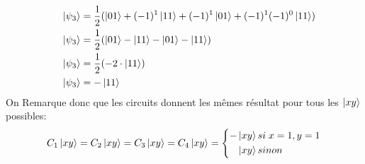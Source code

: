 \documentclass{article}
\begin{document}
\begin{align*}
&&      \ket{\psi_3} &= \frac{1}{2}(\ket{01} + (-1)^1\ket{11} + (-1)^1\ket{01} + (-1)^1(-1)^0\ket{11}) \\
&&      \ket{\psi_3} &= \frac{1}{2}(\ket{01} - \ket{11} - \ket{01} - \ket{11}) \\
&&      \ket{\psi_3} &= \frac{1}{2}(-2 \cdot \ket{11}) \\
&&      \ket{\psi_3} &= -\ket{11} \\
\end{align*}
On Remarque donc que les circuits donnent les mêmes résultat pour tous les $\ket{xy}$ possibles:
\[
C_1\ket{xy} = C_2\ket{xy} = C_3\ket{xy} = C_4\ket{xy} =
    \left\{
        \begin{aligned}
           -&\ket{xy} si\; x = 1, y = 1 \\
            &\ket{xy} sinon \\
        \end{aligned}
    \right .
\] \\

\newpage
\end{document}
